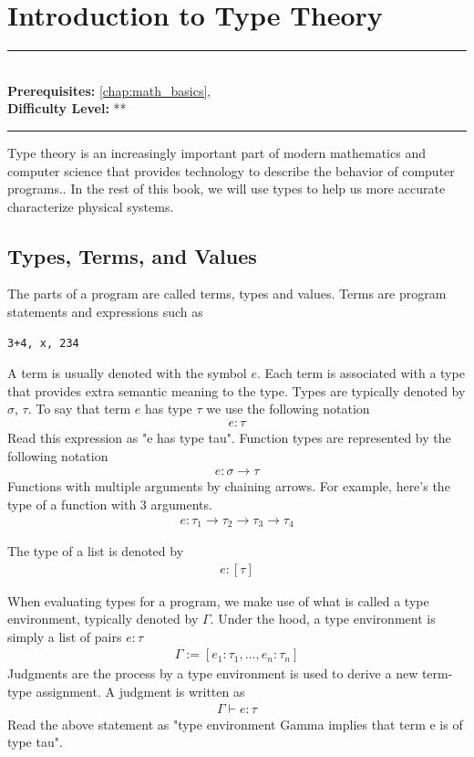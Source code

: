 \documentclass[book.tex]{subfiles}
\begin{document}
\chapter{Introduction to Type Theory}

\label{chap:type_theory}
\noindent\rule{11cm}{0.4pt} \\
\textbf{Prerequisites:}  \autoref{chap:math_basics},   \\
\textbf{Difficulty Level:} ** \\
\noindent\rule{11cm}{0.4pt}
\vspace{5mm}


Type theory is an increasingly important part of modern mathematics and computer science that provides technology to describe the behavior of computer programs.. In the rest of this book, we will use types to help us more accurate characterize physical systems.

\section{Types, Terms, and Values}

The parts of a program are called terms, types and values. Terms are program statements and expressions such as 

\begin{lstlisting}
3+4, x, 234
\end{lstlisting}

A term is usually denoted with the symbol $e$. Each term is associated with a type that provides extra semantic meaning to the type. Types are typically denoted by $\sigma$, $\tau$. To say that term $e$ has type $\tau$ we use the following notation
\begin{align}
    e : \tau
\end{align}
Read this expression as "e has type tau". Function types are represented by the following notation
\begin{align}
    e: \sigma \to \tau
\end{align}
Functions with multiple arguments by chaining arrows. For example, here's the type of a function with 3 arguments.
\begin{align}
    e: \tau_1 \to \tau_2 \to \tau_3 \to \tau_4
\end{align}

The type of a list is denoted by
\begin{align}
    e: [\tau]
\end{align}


When evaluating types for a program, we make use of what is called a type environment, typically denoted by $\Gamma$. Under the hood, a type environment is simply a list of pairs $e: \tau$
\begin{align}
    \Gamma := [e_1: \tau_1,\dotsc,e_n: \tau_n]
\end{align}
Judgments are the process by a type environment is used to derive a new term-type assignment. A judgment is written as
\begin{align}
    \Gamma \vdash e: \tau
\end{align}
Read the above statement as "type environment Gamma implies that term e is of type tau".
\end{document}
